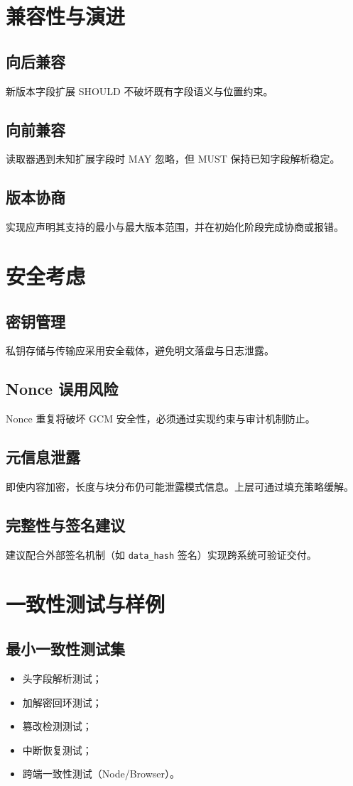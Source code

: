 \documentclass[11pt,a4paper]{article}
\begin{document}
\section{兼容性与演进}
\subsection{向后兼容}
新版本字段扩展 SHOULD 不破坏既有字段语义与位置约束。

\subsection{向前兼容}
读取器遇到未知扩展字段时 MAY 忽略，但 MUST 保持已知字段解析稳定。

\subsection{版本协商}
实现应声明其支持的最小与最大版本范围，并在初始化阶段完成协商或报错。

\section{安全考虑}
\subsection{密钥管理}
私钥存储与传输应采用安全载体，避免明文落盘与日志泄露。

\subsection{Nonce 误用风险}
Nonce 重复将破坏 GCM 安全性，必须通过实现约束与审计机制防止。

\subsection{元信息泄露}
即使内容加密，长度与块分布仍可能泄露模式信息。上层可通过填充策略缓解。

\subsection{完整性与签名建议}
建议配合外部签名机制（如 \texttt{data\_hash} 签名）实现跨系统可验证交付。

\section{一致性测试与样例}
\subsection{最小一致性测试集}
\begin{itemize}
  \item 头字段解析测试；
  \item 加解密回环测试；
  \item 篡改检测测试；
  \item 中断恢复测试；
  \item 跨端一致性测试（Node/Browser）。
\end{itemize}
\end{document}
